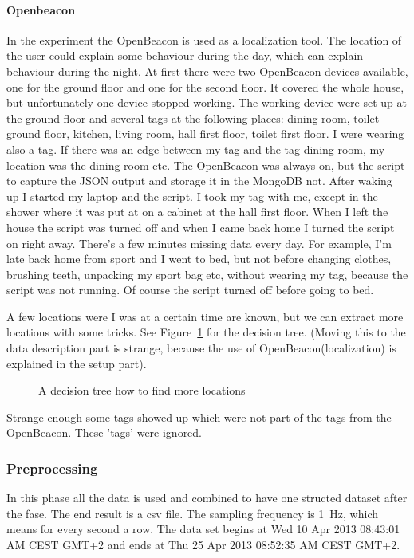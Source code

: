 			\paragraph{Openbeacon}
		 		In the experiment the OpenBeacon is used as a localization tool. The location of the user could explain some behaviour during the day, which can explain behaviour during the night. At first there were two OpenBeacon devices available, one for the ground floor and one for the second floor. It covered the whole house, but unfortunately one device stopped working. The working device were set up at the ground floor and several tags at the following places: dining room, toilet ground floor, kitchen, living room, hall first floor, toilet first floor. I were wearing also a tag. If there was an edge between my tag and the tag dining room, my location was the dining room etc. The OpenBeacon was always on, but the script to capture the JSON output and storage it in the MongoDB not. After waking up I started my laptop and the script. I took my tag with me, except in the shower where it was put at on a cabinet at the hall first floor. When I left the house the script was turned off and when I came back home I turned the script on right away. There's a few minutes missing data every day. For example, I'm late back home from sport and I went to bed, but not before changing clothes, brushing teeth, unpacking my sport bag etc, without wearing my tag, because the script was not running. Of course the script turned off before going to bed.

				
				A few locations were I was at a certain time are known, but we can extract more locations with some tricks. See Figure~\ref{fig:decisiontree} for the decision tree. (Moving this to the data description part is strange, because the use of OpenBeacon(localization) is explained in the setup part).

				\begin{figure}[h!]
					
					\caption{A decision tree how to find more locations}
					\label{fig:decisiontree}
				\end{figure}

				Strange enough some tags showed up which were not part of the tags from the OpenBeacon. These 'tags' were ignored.
				
		\subsubsection{Preprocessing}
			In this phase all the data is used and combined to have one structed dataset after the fase. The end result is a csv file. The sampling frequency is \SI{1}{\hertz}, which means for every second a row. The data set begins at Wed 10 Apr 2013 08:43:01 AM CEST GMT+2 and ends at Thu 25 Apr 2013 08:52:35 AM CEST GMT+2. 
			
